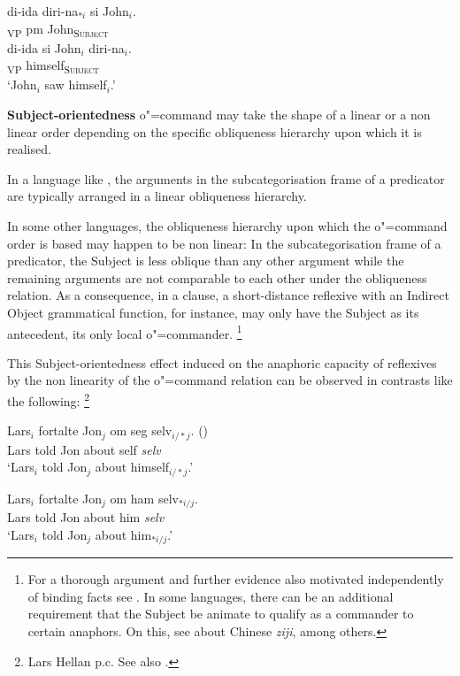 \documentclass[output=paper
,modfonts
,nonflat]{langsci/langscibook}
\begin{document}
\begin{exe}
\ex
\begin{xlist}
\ex
\gll di-ida diri-na$_{*i}$ si John$_{i}$.\\ 
[{\sc objective}-saw himself\textsubscript{\textsc{Object}}]\textsubscript{VP} {\sc pm} John\textsubscript{\textsc{Subject}} \\

\ex
\gll di-ida si John$_{i}$ diri-na$_{i}$.\\ 
[{\sc objective}-saw {\sc pm} John\textsubscript{\textsc{Object}}]\textsubscript{VP} himself\textsubscript{\textsc{Subject}} \\
\trans `John$_{i}$ saw himself$_{i}$.'
\end{xlist}
\end{exe}


\textbf{Subject-orientedness} o"=command may take the shape of a linear or a non linear order
depending on the specific obliqueness hierarchy upon which it is 
realised.

In a language like , the arguments in the
subcategorisation frame of a predicator are typically arranged in a linear obliqueness
hierarchy.

In some other languages, the obliqueness hierarchy upon which the o"=command order
is based may happen to be non linear: In the subcategorisation frame of a
predicator, the Subject is less oblique than any other argument while the remaining arguments
are not comparable to each other under the obliqueness relation. As a consequence, in a clause,
a short-distance reflexive with an Indirect Object grammatical function, for instance, may only
have the Subject as its antecedent, its only local o"=commander.%
\footnote{For a thorough argument and further evidence also motivated
independently of binding facts see \citep{branco:branch96, brancoMarrafa:subject97, branco:livro00}. In 
some languages, there can be an additional requirement that the Subject be
animate to qualify as a commander to certain anaphors. On this, 
see \citep{huangTang:longdistance91, xue:ziji94} about Chinese \emph{ziji}, among others. }
%

This Subject-orientedness effect induced on the anaphoric capacity of reflexives
by the non linearity of the o"=command relation can be observed in contrasts like
the following:%
\footnote{
Lars Hellan p.c. See also \citep[p.67]{hellan:book88}.}

\begin{exe}
\ex
\begin{xlist}
\ex
\gll Lars$_{i}$ fortalte Jon$_{j}$ om seg selv$_{i/*j}$. ()\\ 
Lars told Jon about self \emph{selv} \\
\trans `Lars$_{i}$ told Jon$_{j}$ about himself$_{i/*j}$.'

\ex
\gll Lars$_{i}$ fortalte Jon$_{j}$ om ham selv$_{*i/j}$.\\
Lars told Jon about him \emph{selv}\\
\trans `Lars$_{i}$ told Jon$_{j}$ about him$_{*i/j}$.'
\end{xlist}
\end{exe}
\end{document}
